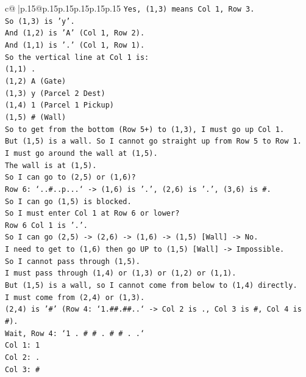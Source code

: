 \documentclass{article}
\begin{document}
{\begin{supertabular}{c@{$\;$}|p{.15\linewidth}@{}p{.15\linewidth}p{.15\linewidth}p{.15\linewidth}p{.15\linewidth}p{.15\linewidth}}
{{{\texttt{Yes, (1,3) means Col 1, Row 3.} \\
\texttt{So (1,3) is 'y'.} \\
\texttt{And (1,2) is 'A' (Col 1, Row 2).} \\
\texttt{And (1,1) is '.' (Col 1, Row 1).} \\
\texttt{So the vertical line at Col 1 is:} \\
\texttt{(1,1) .} \\
\texttt{(1,2) A (Gate)} \\
\texttt{(1,3) y (Parcel 2 Dest)} \\
\texttt{(1,4) 1 (Parcel 1 Pickup)} \\
\texttt{(1,5) \# (Wall)} \\
\texttt{So to get from the bottom (Row 5+) to (1,3), I must go up Col 1.} \\
\texttt{But (1,5) is a wall. So I cannot go straight up from Row 5 to Row 1.} \\
\texttt{I must go around the wall at (1,5).} \\
\texttt{The wall is at (1,5).} \\
\texttt{So I can go to (2,5) or (1,6)?} \\
\texttt{Row 6: `..\#..p...` {-}> (1,6) is '.', (2,6) is '.', (3,6) is \#.} \\
\texttt{So I can go (1,5) is blocked.} \\
\texttt{So I must enter Col 1 at Row 6 or lower?} \\
\texttt{Row 6 Col 1 is '.'.} \\
\texttt{So I can go (2,5) {-}> (2,6) {-}> (1,6) {-}> (1,5) {[}Wall{]} {-}> No.} \\
\texttt{I need to get to (1,6) then go UP to (1,5) {[}Wall{]} {-}> Impossible.} \\
\texttt{So I cannot pass through (1,5).} \\
\texttt{I must pass through (1,4) or (1,3) or (1,2) or (1,1).} \\
\texttt{But (1,5) is a wall, so I cannot come from below to (1,4) directly.} \\
\texttt{I must come from (2,4) or (1,3).} \\
\texttt{(2,4) is '\#' (Row 4: `1.\#\#.\#\#..` {-}> Col 2 is ., Col 3 is \#, Col 4 is \#).} \\
\texttt{Wait, Row 4: `1 . \# \# . \# \# . .`} \\
\texttt{Col 1: 1} \\
\texttt{Col 2: .} \\
\texttt{Col 3: \#} \\
}}}
\end{supertabular}}
\end{document}
